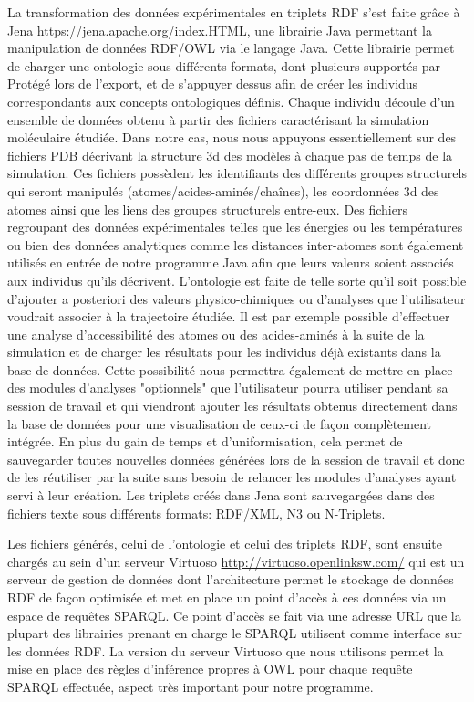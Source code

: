 La transformation des données expérimentales en triplets RDF s'est faite grâce à Jena \url{https://jena.apache.org/index.HTML}, une librairie Java permettant la manipulation de données RDF/OWL via le langage Java. Cette librairie permet de charger une ontologie sous différents formats, dont plusieurs supportés par Protégé lors de l'export, et de s'appuyer dessus afin de créer les individus correspondants aux concepts ontologiques définis. Chaque individu découle d'un ensemble de données obtenu à partir des fichiers caractérisant la simulation moléculaire étudiée. Dans notre cas, nous nous appuyons essentiellement sur des fichiers PDB décrivant la structure 3d des modèles à chaque pas de temps de la simulation. Ces fichiers possèdent les identifiants des différents groupes structurels qui seront manipulés (atomes/acides-aminés/chaînes), les coordonnées 3d des atomes ainsi que les liens des groupes structurels entre-eux. Des fichiers regroupant des données expérimentales telles que les énergies ou les températures ou bien des données analytiques comme les distances inter-atomes sont également utilisés en entrée de notre programme Java afin que leurs valeurs soient associés aux individus qu'ils décrivent. L'ontologie est faite de telle sorte qu'il soit possible d'ajouter a posteriori des valeurs physico-chimiques ou d'analyses que l'utilisateur voudrait associer à la trajectoire étudiée. Il est par exemple possible d'effectuer une analyse d'accessibilité des atomes ou des acides-aminés à la suite de la simulation et de charger les résultats pour les individus déjà existants dans la base de données. Cette possibilité nous permettra également de mettre en place des modules d'analyses "optionnels" que l'utilisateur pourra utiliser pendant sa session de travail et qui viendront ajouter les résultats obtenus directement dans la base de données pour une visualisation de ceux-ci de façon complètement intégrée. En plus du gain de temps et d'uniformisation, cela permet de sauvegarder toutes nouvelles données générées lors de la session de travail et donc de les réutiliser par la suite sans besoin de relancer les modules d'analyses ayant servi à leur création.
Les triplets créés dans Jena sont sauvegargées dans des fichiers texte sous différents formats: RDF/XML, N3 ou N-Triplets. 

Les fichiers générés, celui de l'ontologie et celui des triplets RDF, sont ensuite chargés au sein d'un serveur Virtuoso \url{http://virtuoso.openlinksw.com/} qui est un serveur de gestion de données dont l'architecture permet le stockage de données RDF de façon optimisée et met en place un point d'accès à ces données via un espace de requêtes SPARQL. Ce point d'accès se fait via une adresse URL que la plupart des librairies prenant en charge le SPARQL utilisent comme interface sur les données RDF. La version du serveur Virtuoso que nous utilisons permet la mise en place des règles d'inférence propres à OWL pour chaque requête SPARQL effectuée, aspect très important pour notre programme.

